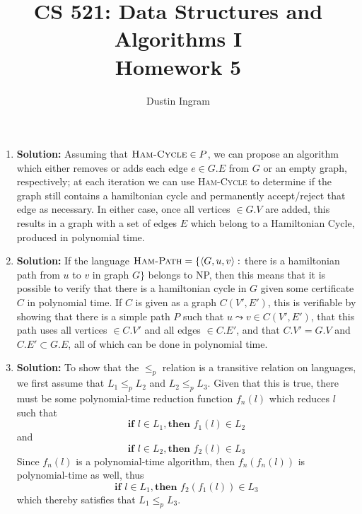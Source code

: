\documentclass{article}
\title{CS 521: Data Structures and Algorithms I \\ Homework 5}
\author{Dustin Ingram}
\begin{document}
\maketitle
\begin{enumerate}
    \item \textbf{Solution:}
    Assuming that $\textsc{Ham-Cycle} \in P$, we can propose an algorithm which either removes or adds each edge $e \in G.E$ from $G$ or an empty graph, respectively; at each iteration we can use \textsc{Ham-Cycle} to determine if the graph still contains a hamiltonian cycle and permanently accept/reject that edge as necessary. In either case, once all vertices $\in G.V$ are added, this results in a graph with a set of edges $E$ which belong to a Hamiltonian Cycle, produced in polynomial time.

    \item \textbf{Solution:} 
    If the language $\textsc{Ham-Path}=\{\langle G, u, v \rangle : $ there is a hamiltonian path from $u$ to $v$ in graph $G\}$ belongs to NP, then this means that it is possible to verify that there is a hamiltonian cycle in $G$ given some certificate $C$ in polynomial time. If $C$ is given as a graph $C(V', E')$, this is verifiable by showing that there is a simple path $P$ such that $u \leadsto v \in C(V', E')$, that this path uses all vertices $\in C.V'$ and all edges $\in C.E'$, and that $C.V' = G.V$ and $C.E' \subset G.E$, all of which can be done in polynomial time. 

    \item \textbf{Solution:} 
    To show that the $\leqslant_{p}$ relation is a transitive relation on languages, we first assume that $L_{1} \leqslant_{p} L_{2}$ and  $L_{2} \leqslant_{p} L_{3}$. Given that this is true, there must be some polynomial-time reduction function $f_{n}(l)$ which reduces $l$ such that
    $$ \textbf{if } l \in L_{1}, \textbf{then } f_{1}(l) \in L_{2}$$
    and
    $$ \textbf{if } l \in L_{2}, \textbf{then } f_{2}(l) \in L_{3}$$
    Since $f_{n}(l)$ is a polynomial-time algorithm, then $f_{n}(f_{n}(l))$ is polynomial-time as well, thus
    $$ \textbf{if } l \in L_{1}, \textbf{then } f_{2}(f_{1}(l)) \in L_{3}$$
    which thereby satisfies that $L_{1} \leqslant_{p} L_{3}$.


\end{enumerate}
\end{document}
